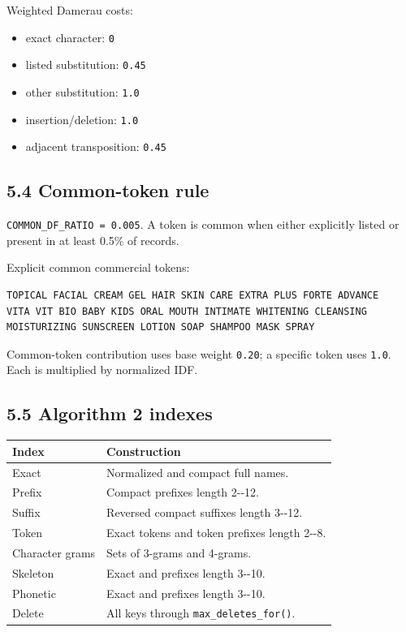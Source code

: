 Weighted Damerau costs:

\begin{itemize}
\tightlist
\item
  exact character: \texttt{0}
\item
  listed substitution: \texttt{0.45}
\item
  other substitution: \texttt{1.0}
\item
  insertion/deletion: \texttt{1.0}
\item
  adjacent transposition: \texttt{0.45}
\end{itemize}

\subsection{5.4 Common-token rule}\label{54-common-token-rule}

\texttt{COMMON\_\allowbreak{}DF\_\allowbreak{}RATIO\ =\ 0.005}. A token is common when either explicitly listed or present in at least 0.5\% of records.

Explicit common commercial tokens:

\begin{verbatim}
TOPICAL FACIAL CREAM GEL HAIR SKIN CARE EXTRA PLUS FORTE ADVANCE
VITA VIT BIO BABY KIDS ORAL MOUTH INTIMATE WHITENING CLEANSING
MOISTURIZING SUNSCREEN LOTION SOAP SHAMPOO MASK SPRAY
\end{verbatim}

Common-token contribution uses base weight \texttt{0.20}; a specific token uses \texttt{1.0}. Each is multiplied by normalized IDF.

\subsection{5.5 Algorithm 2 indexes}\label{55-algorithm-2-indexes}

{\def\LTcaptype{none} %
\begin{longtable}[]{@{}>{\RaggedRight\arraybackslash}p{.27\linewidth}>{\RaggedRight\arraybackslash}p{.66\linewidth}@{}}
\toprule\noalign{}
Index & Construction \\
\midrule\noalign{}
\endhead
\bottomrule\noalign{}
\endlastfoot
Exact & Normalized and compact full names. \\
Prefix & Compact prefixes length 2-\/-12. \\
Suffix & Reversed compact suffixes length 3-\/-12. \\
Token & Exact tokens and token prefixes length 2-\/-8. \\
Character grams & Sets of 3-grams and 4-grams. \\
Skeleton & Exact and prefixes length 3-\/-10. \\
Phonetic & Exact and prefixes length 3-\/-10. \\
Delete & All keys through \texttt{max\_\allowbreak{}deletes\_\allowbreak{}for()}. \\
\end{longtable}
}

